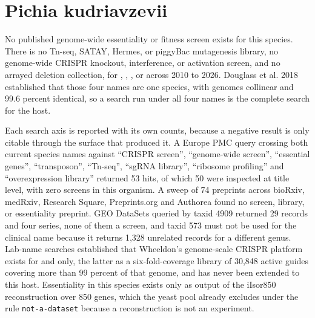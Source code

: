 
\section{Pichia kudriavzevii}\label{sec:pk}

No published genome-wide essentiality or fitness screen exists for this species. There is no
Tn-seq, SATAY, Hermes, or piggyBac mutagenesis library, no genome-wide CRISPR knockout,
interference, or activation screen, and no arrayed deletion collection, for
, , , or
 across 2010 to 2026. Douglass et al. 2018 established that those
four names are one species, with genomes collinear and 99.6 percent identical, so a search run
under all four names is the complete search for the host.

Each search axis is reported with its own counts, because a negative result is only citable
through the surface that produced it. A Europe PMC query crossing both current species names against ``CRISPR screen'',
``genome-wide screen'', ``essential genes'', ``transposon'', ``Tn-seq'', ``sgRNA library'',
``ribosome profiling'' and ``overexpression library'' returned 53 hits, of which 50 were
inspected at title level, with zero screens in this organism. A sweep of 74 preprints across
bioRxiv, medRxiv, Research Square, Preprints.org and Authorea found no screen, library, or
essentiality preprint. GEO DataSets queried by taxid 4909 returned 29 records and four series,
none of them a screen, and taxid 573 must not be used for the clinical name because it returns
1,328 unrelated records for a different genus. Lab-name searches established that Wheeldon's
genome-scale CRISPR platform exists for  and  only, the latter as a six-fold-coverage library of 30,848 active guides covering more
than 99 percent of that genome, and has never been extended to this host. Essentiality in this
species exists only as output of the iIsor850 reconstruction over 850 genes, which the yeast
pool already excludes under the rule \texttt{not-a-dataset} because a reconstruction is not an
experiment.

